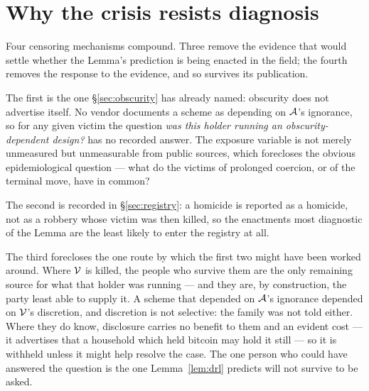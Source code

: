\section{Why the crisis resists diagnosis}
\label{sec:anosognosia}

\begin{remark}
\label{rem:anosognosia}
Four censoring mechanisms compound. Three remove the evidence that would settle
whether the Lemma's prediction is being enacted in the field; the fourth removes the
response to the evidence, and so survives its publication.

The first is the one \S\ref{sec:obscurity} has already named: obscurity does not advertise
itself. No vendor documents a scheme as depending on $\mathcal{A}$'s ignorance, so
for any given victim the question \emph{was this holder running an
obscurity-dependent design?} has no recorded answer. The exposure variable is not
merely unmeasured but unmeasurable from public sources, which forecloses the
obvious epidemiological question --- what do the victims of prolonged coercion, or
of the terminal move, have in common?

The second is recorded in \S\ref{sec:registry}: a homicide is reported as a
homicide, not as a robbery whose victim was then killed, so the enactments most
diagnostic of the Lemma are the least likely to enter the registry at all.

The third forecloses the one route by which the first two might have been worked
around. Where $\mathcal{V}$ is killed, the people who survive them are the only
remaining source for what that holder was running --- and they are, by
construction, the party least able to supply it. A scheme that depended on
$\mathcal{A}$'s ignorance depended on $\mathcal{V}$'s discretion, and discretion is not
selective: the family was not told either. Where they do know, disclosure carries
no benefit to them and an evident cost --- it advertises that a household which
held bitcoin may hold it still --- so it is withheld unless it might help resolve
the case. The one person who could have answered the question is the one
Lemma~\ref{lem:drl} predicts will not survive to be asked.


\end{remark}
